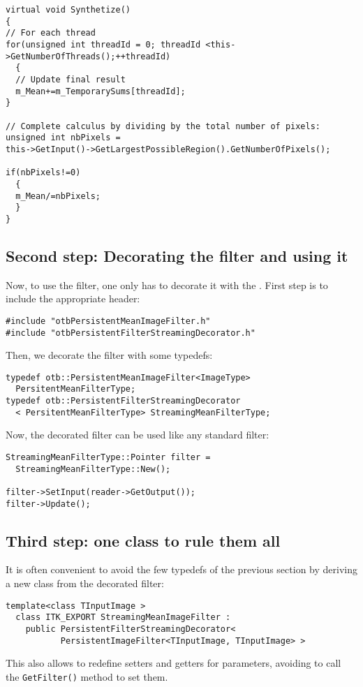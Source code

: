 \begin{verbatim}
virtual void Synthetize()
{
// For each thread
for(unsigned int threadId = 0; threadId <this->GetNumberOfThreads();++threadId)
  {
  // Update final result
  m_Mean+=m_TemporarySums[threadId];
} 

// Complete calculus by dividing by the total number of pixels:
unsigned int nbPixels =
this->GetInput()->GetLargestPossibleRegion().GetNumberOfPixels();

if(nbPixels!=0)
  {
  m_Mean/=nbPixels;
  }  
}
\end{verbatim}

\subsection{Second step: Decorating the filter and using it}

Now, to use the filter, one only has to decorate it with the
. First step is
to include the appropriate header:

\begin{verbatim}
#include "otbPersistentMeanImageFilter.h"
#include "otbPersistentFilterStreamingDecorator.h"
\end{verbatim}

Then, we decorate the filter with some typedefs:

\begin{verbatim}
typedef otb::PersistentMeanImageFilter<ImageType>
  PersitentMeanFilterType;
typedef otb::PersistentFilterStreamingDecorator
  < PersitentMeanFilterType> StreamingMeanFilterType;
\end{verbatim}

Now, the decorated filter can be used like any standard filter:

\begin{verbatim}
StreamingMeanFilterType::Pointer filter =
  StreamingMeanFilterType::New();

filter->SetInput(reader->GetOutput());
filter->Update();
\end{verbatim}

\subsection{Third step: one class to rule them all}

It is often convenient to avoid the few typedefs of the previous
section by deriving a new class from the decorated filter:

\begin{verbatim}
template<class TInputImage >
  class ITK_EXPORT StreamingMeanImageFilter :
    public PersistentFilterStreamingDecorator<
           PersistentImageFilter<TInputImage, TInputImage> >
\end{verbatim}

This also allows to redefine setters and getters for parameters,
avoiding to call the \verb?GetFilter()? method to set them.
